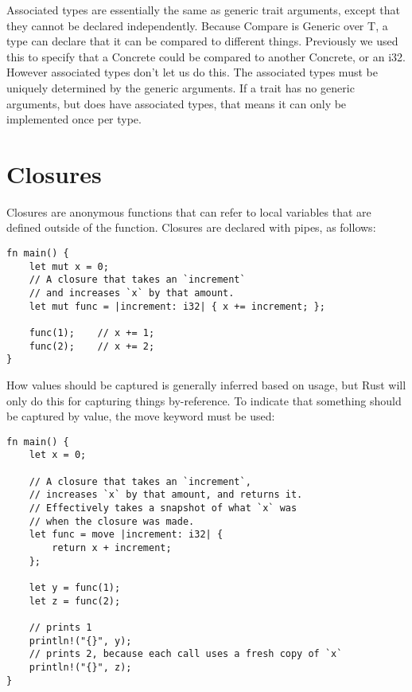 Associated types are essentially the same as generic trait arguments,
except that they cannot be declared independently. Because Compare is
Generic over T, a type can declare that it can be compared to different things.
Previously we used this to specify that a Concrete could be compared to another
Concrete, or an i32. However associated types don't let us do this. The associated
types must be uniquely determined by the generic arguments. If a trait has no
generic arguments, but does have associated types, that means it can only be
implemented once per type.





\section{Closures}

Closures are anonymous functions that can refer to local variables that are
defined outside of the function. Closures are declared with pipes, as follows:

\begin{verbatim}
fn main() {
    let mut x = 0;
    // A closure that takes an `increment`
    // and increases `x` by that amount.
    let mut func = |increment: i32| { x += increment; };

    func(1);    // x += 1;
    func(2);    // x += 2;
}
\end{verbatim}

How values should be captured is generally inferred based on usage, but Rust
will only do this for capturing things by-reference. To indicate that something
should be captured by value, the move keyword must be used:

\begin{verbatim}
fn main() {
    let x = 0;

    // A closure that takes an `increment`,
    // increases `x` by that amount, and returns it.
    // Effectively takes a snapshot of what `x` was
    // when the closure was made.
    let func = move |increment: i32| {
        return x + increment;
    };

    let y = func(1);
    let z = func(2);

    // prints 1
    println!("{}", y);
    // prints 2, because each call uses a fresh copy of `x`
    println!("{}", z);
}
\end{verbatim}




